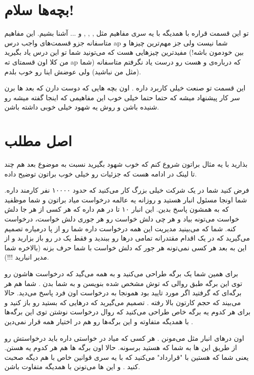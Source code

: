 \documentclass[]{article}
\begin{document}
\section*{{\titr بچه‌ها سلام!}}
تو این قسمت قراره با همدیگه با یه سری مفاهیم مثل ,  ,  ,  و ... آشنا بشیم. این مفاهیم متاسفانه جزو قسمت‌های واجب درس ap شما نیست ولی جز مهم‌ترین چیز‌ها و مفیدترین چیزهایی هست که می‌تونید شما تو این درس یاد بگیرید (بین خودمون باشه! من کلا اون قسمتای ته ap که درباره‌ی  و  هست رو درست یاد نگرفتم متاسفانه (شما مثل من نباشید) ولی عوضش اینا رو خوب بلدم).
 
این قسمت تو صنعت خیلی کاربرد داره . اون بچه هایی که دوست دارن که بعد ها برن سر کار پیشنهاد میشه که حتما حتما خیلی خوب  این مفاهیمی که اینجا گفته میشه رو شنیده باشن و روش یه شهود خیلی خوبی داشته باشن.

\section*{{\titr اصل مطلب}}
بذارید با یه مثال براتون شروع کنم که خوب شهود بگیرید نسبت به موضوع بعد هم چند تا لینک در ادامه هست که جزئیات رو خیلی خوب براتون توضیح داده.

فرض کنید شما در یک شرکت خیلی بزرگ کار می‌کنید که حدود ۱۰۰۰۰ نفر کارمند داره. شما اونجا مسئول انبار هستید و روزانه یه عالمه درخواست میاد براتون و شما موظفید که به همشون پاسخ بدین. این انبار ۱۰ تا در هم داره که هر کسی از هر جا دلش خواست می‌تونه بیاد و هر چی دلش خواست رو هر جوری دلش خواست، درخواست کنه. شما که می‌بینید مدیریت این همه درخواست داره شما رو از پا درمیاره تصمیم می‌گیرید که در یک اقدام مقتدرانه تمامی درها رو ببندید و فقط یک در رو باز بزارید و از این به بعد هر کسی نمی‌تونه هر جور که دلش خواست با شما حرف بزنه (بالاخره شما مدیر انبارید !!!).

برای همین شما یک برگه طراحی می‌کنید و به همه می‌گید که درخواست هاشون رو توی این برگه طبق روالی که توش مشخص شده بنویسن و به شما بدن . شما هم هر برگه‌ای که گرفتید اگر مورد تایید بود همونجا به درخواست اون فرد پاسخ می‌دید. حالا می‌بیند که حجم کارتون بالا رفته . تصمیم می‌گیرید که درهایی که بستید رو باز کنید و برای هر کدوم یه برگه خاص طراحی می‌کنید که روال درخواست نوشتن توی این برگه‌ها با همدیگه متفاوته و  این برگه‌ها رو هم در اختیار همه قرار نمی‌دین . 

اون درهای انبار مثل  می‌مونن . هر کسی که میاد در خواستی داره باید درخواستش رو از طریق این  ها به شما که  هستید برسونه. حالا اون برگه ها هم هر کدوم یه  هستن. یعنی شما که  هستین با  "قرارداد" می‌کنید که با یه سری قوانین خاص با هم دیگه صحبت کنید . و این  ها می‌تونن با همدیگه متفاوت باشن.
\end{document}
